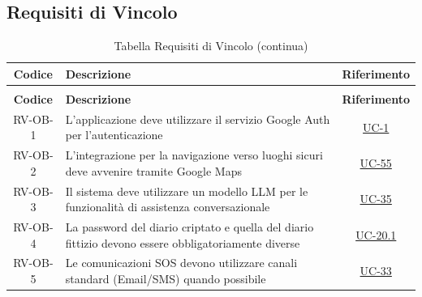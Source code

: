 \documentclass[a4paper,12pt]{article}
\begin{document}
\subsection{Requisiti di Vincolo} \label{subsection:requisiti_vincolo}
\begin{center}
\renewcommand{\arraystretch}{1.5}
\begin{longtable}{|c|p{9cm}|c|}
\caption{Tabella Requisiti di Vincolo} \label{tab:requisiti_vincolo} \\
\hline
\rowcolor{gray!60}
\textbf{Codice} & \textbf{Descrizione} & \textbf{Riferimento} \\
\hline
\endfirsthead
\caption[]{Tabella Requisiti di Vincolo (continua)} \\
\hline
\rowcolor{gray!60}
\textbf{Codice} & \textbf{Descrizione} & \textbf{Riferimento} \\
\hline
\endhead
\rowcolor{white}
RV-OB-1 & L'applicazione deve utilizzare il servizio Google Auth per l'autenticazione & \hyperref[subsec:UC-1]{UC-1} \\
\hline
\rowcolor{gray!20}
RV-OB-2 & L'integrazione per la navigazione verso luoghi sicuri deve avvenire tramite Google Maps & \hyperref[subsec:UC-55]{UC-55} \\
\hline
\rowcolor{white}
RV-OB-3 & Il sistema deve utilizzare un modello LLM per le funzionalità di assistenza conversazionale & \hyperref[sec:UC-35]{UC-35} \\
\hline
\rowcolor{gray!20}
RV-OB-4 & La password del diario criptato e quella del diario fittizio devono essere obbligatoriamente diverse & \hyperref[subsec:UC-20.1]{UC-20.1} \\
\hline
\rowcolor{white}
RV-OB-5 & Le comunicazioni SOS devono utilizzare canali standard (Email/SMS) quando possibile & \hyperref[sec:UC-33]{UC-33} \\
\hline
\end{longtable}
\end{center}
\end{document}
